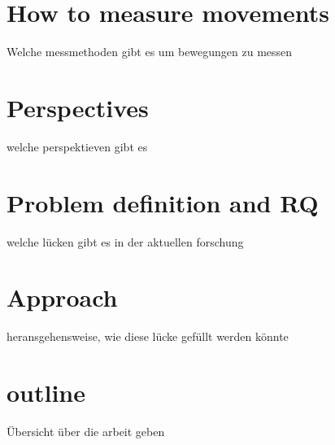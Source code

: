 \section{How to measure movements}
Welche messmethoden gibt es um bewegungen zu messen

\section{Perspectives}
welche perspektieven gibt es

\section{Problem definition and RQ}
welche lücken gibt es in der aktuellen forschung

\section{Approach}
heransgehensweise, wie diese lücke gefüllt werden könnte

\section{outline}
Übersicht über die arbeit geben

